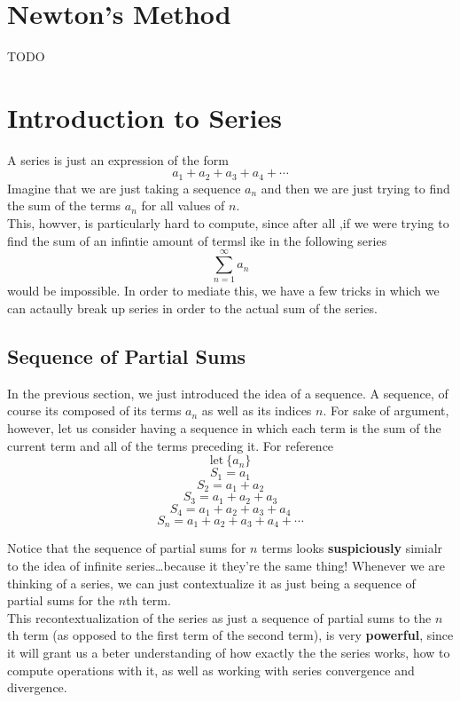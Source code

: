 \documentclass{report}
\begin{document}
\begin{sloppypar}
\section{Newton's Method}
TODO

\section{Introduction to Series}
A series is just an expression of the form
\[ a_{1} + a_{2} + a_{3} + a_{4} + \cdots \]
Imagine that we are just taking a sequence  $ a_{n}$ and then
we are just trying to find the sum of the terms $ a_{n} $ for
all values of $ n $.
\\
This, howver, is particularly hard to compute, since after all
,if we were trying to find the sum of an infintie amount
of termsl ike in the following series
\[ \sum_{n=1}^{\infty} a_{n}\]
would be impossible. In order to mediate this, we have a
few tricks in which we can actaully break up series in order
to the actual sum of the series.

\subsection{Sequence of Partial Sums }
In the previous section, we just introduced the idea of a
sequence. A sequence, of course its composed of its terms $ a_{n}$ as well as its indices $ n $. For sake of argument, however, let us consider having a sequence in which each term is the sum of the current term and all of the terms preceding it. For reference
\[ \textrm{let} ~ \{a_{n}\} \]
\[ S_{1} = a_{1}\]
\[ S_{2} = a_{1} + a_{2}\]
\[ S_{3} = a_{1} + a_{2} + a_{3}\]
\[ S_{4} = a_{1} + a_{2} + a_{3} + a_{4} \]
\[ S_{n} = a_{1} + a_{2} + a_{3} + a_{4} + \cdots \]

Notice that the sequence of partial sums for $ n $ terms
looks \textbf{suspiciously} simialr to the idea of infinite
series\dots because it they're the same thing! Whenever we
are thinking of a series, we can just contextualize it as
just being a sequence of partial sums for the $ n $th term.
\\
This recontextualization of the series as just a sequence
of partial sums to the $ n$th term (as opposed to the
first term of the second term), is very \textbf{powerful},
since it will grant us a beter understanding of how exactly
the the series works, how to compute operations with it,
as well as working with series convergence and divergence.


\end{sloppypar}
\end{document}
